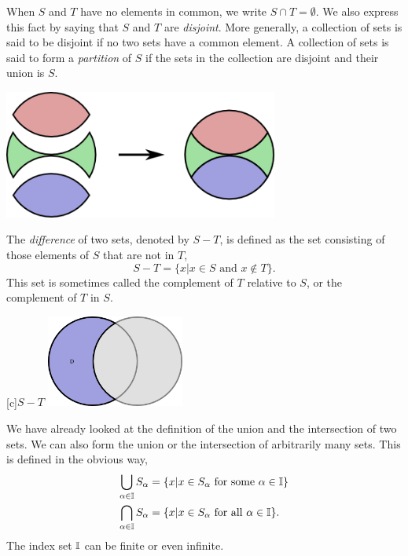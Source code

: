 When $S$ and $T$ have no elements in common, we write $S \cap T = \emptyset$.
We also express this fact by saying that $S$ and $T$ are \emph{disjoint}. 
More generally, a collection of sets is said to be disjoint if no two sets have a common element.
A collection of sets is said to form a \emph{partition} of $S$ if the sets in the collection are disjoint and their union is $S$. 

\begin{center}
\includegraphics[height=4.23cm]{Figures/1Chapter/setpartition}
\end{center}

The \emph{difference} of two sets, denoted by $S - T$, is defined as the set consisting of those elements of $S$ that are not in $T$,
\begin{equation*}
S - T = \{ x | x \in S \text{ and } x \notin T \} .
\end{equation*}
This set is sometimes called the complement of $T$ relative to $S$, or the complement of $T$ in $S$.

\begin{center}
\begin{psfrags}
[c]{$S - T$}
\includegraphics[height=3.03cm]{Figures/1Chapter/difference}
\end{psfrags}
\end{center}

We have already looked at the definition of the union and the intersection of two sets.
We can also form the union or the intersection of arbitrarily many sets.
This is defined in the obvious way,
\begin{align*}
\bigcup_{\alpha \in \mathbb{I}} S_{\alpha}
&= \{ x | x \in S_{\alpha} \text{ for some } \alpha \in \mathbb{I} \} \\
\bigcap_{\alpha \in \mathbb{I}} S_{\alpha}
&= \{ x | x \in S_{\alpha} \text{ for all } \alpha \in \mathbb{I} \} .
\end{align*}
The index set $\mathbb{I}$ can be finite or even infinite.


